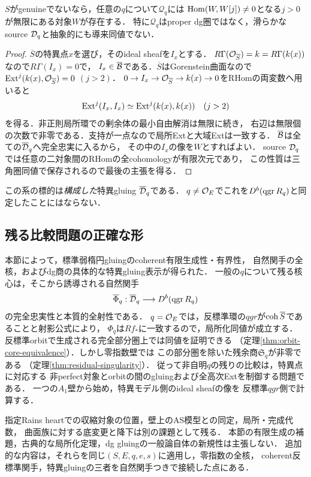 \begin{corollary}[零根壁の商圏には高次自己Extが残る]\label{cor:singular-gluing-unbounded}
$S$がgenuineでないなら，任意の$q$について$\mathcal Q_q$には
$\operatorname{Hom}(W,W[j])\ne0$となる$j>0$が無限にある対象$W$が存在する．
特に$\mathcal Q_q$はproper dg圏ではなく，滑らかなsource $\mathcal D_q$と抽象的にも導来同値でない．
\end{corollary}
\begin{proof}
$\overline S$の特異点$x$を選び，そのideal sheafを$I_x$とする．
$R\Gamma(\mathcal O_{\overline S})=k=R\Gamma(k(x))$なので$R\Gamma(I_x)=0$で，
$I_x\in\overline{\mathcal B}$である．$\overline S$はGorenstein曲面なので
$\operatorname{Ext}^j(k(x),\mathcal O_{\overline S})=0$ $(j>2)$．
$0\to I_x\to\mathcal O_{\overline S}\to k(x)\to0$をRHomの両変数へ用いると
\[
 \operatorname{Ext}^j(I_x,I_x)\simeq\operatorname{Ext}^j(k(x),k(x))\quad(j>2)
\]
を得る．非正則局所環での剰余体の最小自由解消は無限に続き，
右辺は無限個の次数で非零である．支持が一点なので局所Extと大域Extは一致する．
$\overline{\mathcal B}$は全ての$\overline{\mathcal D}_q$へ完全忠実に入るから，
その中の$I_x$の像を$W$とすればよい．
source $\mathcal D_q$では任意の二対象間のRHomの全cohomologyが有限次元であり，
この性質は三角圏同値で保存されるので最後の主張を得る．
\end{proof}
この系の標的は\emph{構成した}特異gluing $\overline{\mathcal D}_q$である．
$q\ne\mathcal O_E$でこれを$D^b(\operatorname{qgr} R_q)$と同定したことにはならない．

\subsection{残る比較問題の正確な形}\label{subsec:coherent-future}
本節によって，標準弱楕円gluingのcoherent有限生成性・有界性，
自然関手の全核，およびdg商の具体的な特異gluing表示が得られた．
一般の$q$について残る核心は，そこから誘導される自然関手
\[
 \overline\Phi_q:\overline{\mathcal D}_q\longrightarrow D^b(\operatorname{qgr} R_q)
\]
の完全忠実性と本質的全射性である．
$q=\mathcal O_E$では，反標準環の$qgr$が$\operatorname{coh}\overline S$であることと射影公式により，
$\Phi_q$は$Rf_*$に一致するので，局所化同値が成立する．
反標準orbitで生成される完全部分圏上では同値を証明できる
（定理\ref{thm:orbit-core-equivalence}）．しかし零指数壁では
この部分圏を除いた残余商$\mathfrak S_q$が非零である
（定理\ref{thm:residual-singularity}）．
従って非自明$q$の残りの比較は，特異点に対応する
非perfect対象とorbitの間のgluingおよび全高次Extを制御する問題である．
一つの$A_1$壁から始め，特異モデル側のideal sheafの像を
反標準$qgr$側で計算する．

指定Rains heartでの収縮対象の位置，壁上のAS模型との同定，局所・完成代数，
曲面族に対する底変更と降下は別の課題として残る．
本節の有限生成の補題，古典的な局所化定理，dg gluingの一般論自体の新規性は主張しない．
追加的な内容は，それらを同じ$(S,E,q,e,s)$に適用し，零指数の全核，
coherent反標準関手，特異gluingの三者を自然関手つきで接続した点にある．
